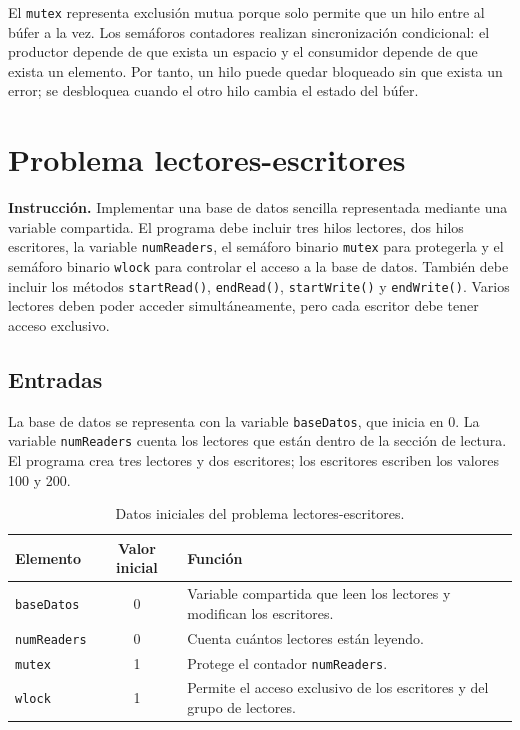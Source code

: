 \documentclass[12pt,oneside]{template/liverpoolthesis}
\begin{document}
El \texttt{mutex} representa exclusión mutua porque solo permite que un hilo
entre al búfer a la vez. Los semáforos contadores realizan sincronización
condicional: el productor depende de que exista un espacio y el consumidor
depende de que exista un elemento. Por tanto, un hilo puede quedar bloqueado
sin que exista un error; se desbloquea cuando el otro hilo cambia el estado del
búfer.

\chapter{Problema lectores-escritores}

\textbf{Instrucción.} Implementar una base de datos sencilla representada
mediante una variable compartida. El programa debe incluir tres hilos
lectores, dos hilos escritores, la variable \texttt{numReaders}, el semáforo
binario \texttt{mutex} para protegerla y el semáforo binario \texttt{wlock}
para controlar el acceso a la base de datos. También debe incluir los métodos
\texttt{startRead()}, \texttt{endRead()}, \texttt{startWrite()} y
\texttt{endWrite()}. Varios lectores deben poder acceder simultáneamente, pero
cada escritor debe tener acceso exclusivo.

\section{Entradas}

La base de datos se representa con la variable \texttt{baseDatos}, que inicia
en 0. La variable \texttt{numReaders} cuenta los lectores que están dentro de
la sección de lectura. El programa crea tres lectores y dos escritores; los
escritores escriben los valores 100 y 200.

\begin{table}[H]
\centering
\caption{Datos iniciales del problema lectores-escritores.}
\label{tab:entradas-lectores-escritores}
\begin{tabularx}{\textwidth}{P{4.0cm} c L}
\toprule
\textbf{Elemento} & \textbf{Valor inicial} & \textbf{Función}\\
\midrule
\texttt{baseDatos} & 0 & Variable compartida que leen los lectores y modifican los escritores.\\
\texttt{numReaders} & 0 & Cuenta cuántos lectores están leyendo.\\
\texttt{mutex} & 1 & Protege el contador \texttt{numReaders}.\\
\texttt{wlock} & 1 & Permite el acceso exclusivo de los escritores y del grupo de lectores.\\
\bottomrule
\end{tabularx}
\end{table}
\end{document}
